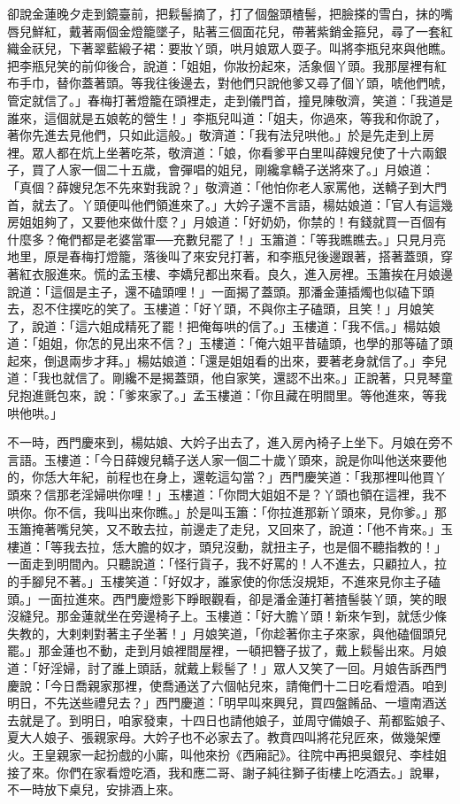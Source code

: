 卻說金蓮晚夕走到鏡臺前，把鬏髻摘了，打了個盤頭楂髻，把臉搽的雪白，抹的嘴唇兒鮮紅，戴著兩個金燈籠墜子，貼著三個面花兒，帶著紫銷金箍兒，尋了一套紅織金祆兒，下著翠藍緞子裙：要妝丫頭，哄月娘眾人耍子。叫將李瓶兒來與他瞧。把李瓶兒笑的前仰後合，說道：「姐姐，你妝扮起來，活象個丫頭。我那屋裡有紅布手巾，替你蓋著頭。等我往後邊去，對他們只說他爹又尋了個丫頭，唬他們唬，管定就信了。」春梅打著燈籠在頭裡走，走到儀門首，撞見陳敬濟，笑道：「我道是誰來，這個就是五娘乾的營生！」李瓶兒叫道：「姐夫，你過來，等我和你說了，著你先進去見他們，只如此這般。」敬濟道：「我有法兒哄他。」於是先走到上房裡。眾人都在炕上坐著吃茶，敬濟道：「娘，你看爹平白里叫薛嫂兒使了十六兩銀子，買了人家一個二十五歲，會彈唱的姐兒，剛纔拿轎子送將來了。」月娘道： 「真個？薛嫂兒怎不先來對我說？」敬濟道：「他怕你老人家罵他，送轎子到大門首，就去了。丫頭便叫他們領進來了。」大妗子還不言語，楊姑娘道：「官人有這幾房姐姐夠了，又要他來做什麼？」月娘道：「好奶奶，你禁的！有錢就買一百個有什麼多？俺們都是老婆當軍──充數兒罷了！」玉簫道：「等我瞧瞧去。」只見月亮地里，原是春梅打燈籠，落後叫了來安兒打著，和李瓶兒後邊跟著，搭著蓋頭，穿著紅衣服進來。慌的孟玉樓、李嬌兒都出來看。良久，進入房裡。玉簫挨在月娘邊說道：「這個是主子，還不磕頭哩！」一面揭了蓋頭。那潘金蓮插燭也似磕下頭去，忍不住撲吃的笑了。玉樓道：「好丫頭，不與你主子磕頭，且笑！」月娘笑了，說道：「這六姐成精死了罷！把俺每哄的信了。」玉樓道：「我不信。」楊姑娘道：「姐姐，你怎的見出來不信？」玉樓道：「俺六姐平昔磕頭，也學的那等磕了頭起來，倒退兩步才拜。」楊姑娘道：「還是姐姐看的出來，要著老身就信了。」李兒道：「我也就信了。剛纔不是揭蓋頭，他自家笑，還認不出來。」正說著，只見琴童兒抱進氈包來，說：「爹來家了。」孟玉樓道：「你且藏在明間里。等他進來，等我哄他哄。」

不一時，西門慶來到，楊姑娘、大妗子出去了，進入房內椅子上坐下。月娘在旁不言語。玉樓道：「今日薛嫂兒轎子送人家一個二十歲丫頭來，說是你叫他送來要他的，你恁大年紀，前程也在身上，還乾這勾當？」西門慶笑道：「我那裡叫他買丫頭來？信那老淫婦哄你哩！」玉樓道：「你問大姐姐不是？丫頭也領在這裡，我不哄你。你不信，我叫出來你瞧。」於是叫玉簫：「你拉進那新丫頭來，見你爹。」那玉簫掩著嘴兒笑，又不敢去拉，前邊走了走兒，又回來了，說道：「他不肯來。」玉樓道：「等我去拉，恁大膽的奴才，頭兒沒動，就扭主子，也是個不聽指教的！」一面走到明間內。只聽說道：「怪行貨子，我不好罵的！人不進去，只顧拉人，拉的手腳兒不著。」玉樓笑道：「好奴才，誰家使的你恁沒規矩，不進來見你主子磕頭。」一面拉進來。西門慶燈影下睜眼觀看，卻是潘金蓮打著揸髻裝丫頭，笑的眼沒縫兒。那金蓮就坐在旁邊椅子上。玉樓道：「好大膽丫頭！新來乍到，就恁少條失教的，大剌剌對著主子坐著！」月娘笑道，「你趁著你主子來家，與他磕個頭兒罷。」那金蓮也不動，走到月娘裡間屋裡，一頓把簪子拔了，戴上鬏髻出來。月娘道：「好淫婦，討了誰上頭話，就戴上鬏髻了！」眾人又笑了一回。月娘告訴西門慶說：「今日喬親家那裡，使喬通送了六個帖兒來，請俺們十二日吃看燈酒。咱到明日，不先送些禮兒去？」西門慶道：「明早叫來興兒，買四盤餚品、一壇南酒送去就是了。到明日，咱家發柬，十四日也請他娘子，並周守備娘子、荊都監娘子、夏大人娘子、張親家母。大妗子也不必家去了。教賁四叫將花兒匠來，做幾架煙火。王皇親家一起扮戲的小廝，叫他來扮《西廂記》。往院中再把吳銀兒、李桂姐接了來。你們在家看燈吃酒，我和應二哥、謝子純往獅子街樓上吃酒去。」說畢，不一時放下桌兒，安排酒上來。

